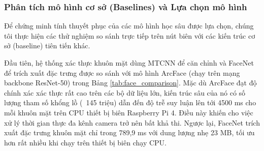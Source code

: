 \documentclass[12pt,a4paper]{article}
\begin{document}
\begin{table}[h]
    \centering
    \caption{Chỉ số mô hình phát hiện bất thường đa nguy cơ (Kết quả đo lường thực tế)}
    \label{tab:anomaly_bench}
\end{table}

\begin{table}[h]
    \centering
    \caption{Khả năng mở rộng tốc độ khung hình (FPS) khi xử lý đa camera (CPU Mode trên Pi 4)}
    \label{tab:fps_bench}
\end{table}

\subsubsection*{Phân tích mô hình cơ sở (Baselines) và Lựa chọn mô hình}
Để chứng minh tính thuyết phục của các mô hình học sâu được lựa chọn, chúng tôi thực hiện các thử nghiệm so sánh trực tiếp trên nút biên với các kiến trúc cơ sở (baseline) tiên tiến khác.

Đầu tiên, hệ thống xác thực khuôn mặt dùng MTCNN để căn chỉnh và FaceNet để trích xuất đặc trưng được so sánh với mô hình ArcFace \cite{arcface_2019} (chạy trên mạng backbone ResNet-50) trong Bảng \ref{tab:face_comparison}.
Mặc dù ArcFace đạt độ chính xác xác thực rất cao trên các bộ dữ liệu lớn, kiến trúc sâu của nó có số lượng tham số khổng lồ (~145 triệu) dẫn đến độ trễ suy luận lên tới 4500 ms cho mỗi khuôn mặt trên CPU thiết bị biên Raspberry Pi 4. Điều này khiến cho việc xử lý thời gian thực đa kênh camera trở nên bất khả thi. Ngược lại, FaceNet trích xuất đặc trưng khuôn mặt chỉ trong 789,9 ms với dung lượng nhẹ 23 MB, tối ưu hơn rất nhiều khi chạy trên thiết bị biên chạy CPU.
\end{document}
